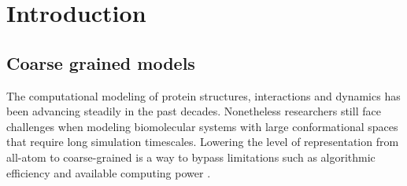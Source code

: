 \documentclass[
	12pt,				%
	openright,			%
	twoside,			%
	a4paper,			%
	english,			%
	french,				%
	spanish,			%
	brazil,				%
	]{abntex2}
\begin{document}
\listoffigures*
\cleardoublepage

\listoftables*
\cleardoublepage



\tableofcontents*
\cleardoublepage


\textual

\chapter{Introduction}

\section{Coarse grained models}

The computational modeling of protein structures, interactions and dynamics has been advancing steadily in the past decades. Nonetheless researchers still face challenges when modeling biomolecular systems with large conformational spaces that require long simulation timescales. Lowering the level of representation from all-atom to coarse-grained is a way to bypass limitations such as algorithmic efficiency and available computing power \cite{Vendruscolo2011}.
\end{document}
